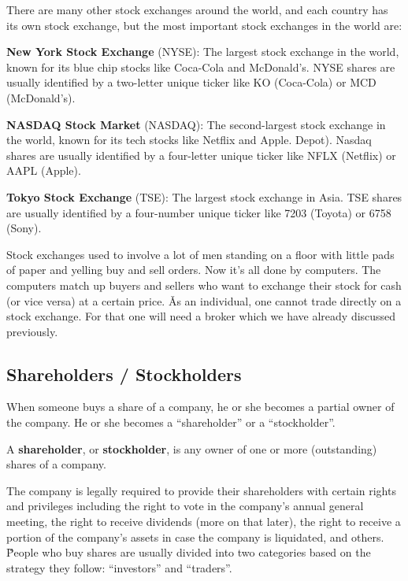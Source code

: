 There are many other stock exchanges around the world, and each country has its own stock exchange, but the most
important stock exchanges in the world are:
\bit
\item \textbf{New York Stock Exchange} (NYSE): The largest stock exchange in the world, known for its blue chip stocks
like Coca-Cola and McDonald's. NYSE shares are usually identified by a two-letter unique ticker like KO (Coca-Cola) or
MCD (McDonald's).
\item \textbf{NASDAQ Stock Market} (NASDAQ): The second-largest stock exchange in the world, known for its tech stocks
like Netflix and Apple. Depot). Nasdaq shares are usually identified by a four-letter unique ticker like NFLX (Netflix)
or AAPL (Apple).
\item \textbf{Tokyo Stock Exchange} (TSE): The largest stock exchange in Asia. TSE shares are usually identified by a
four-number unique ticker like 7203 (Toyota) or 6758 (Sony).
\eit

Stock exchanges used to involve a lot of men standing on a floor with little pads of paper and yelling buy and sell
orders. Now it's all done by computers. The computers match up buyers and sellers who want to exchange their stock for
cash (or vice versa) at a certain price. \v

As an individual, one cannot trade directly on a stock exchange. For that one will need a broker which we have already
discussed previously.

\subsection{Shareholders / Stockholders}

When someone buys a share of a company, he or she becomes a partial owner of the company. He or she becomes a
``shareholder'' or a ``stockholder''.

A \textbf{shareholder}, or \textbf{stockholder}, is any owner of one or more (outstanding) shares of a company.
\ed

The company is legally required to provide their shareholders with certain rights and privileges including the right
to vote in the company's annual general meeting, the right to receive dividends (more on that later), the right to
receive a portion of the company's assets in case the company is liquidated, and others. \v

People who buy shares are usually divided into two categories based on the strategy they follow: ``investors'' and
``traders''.

